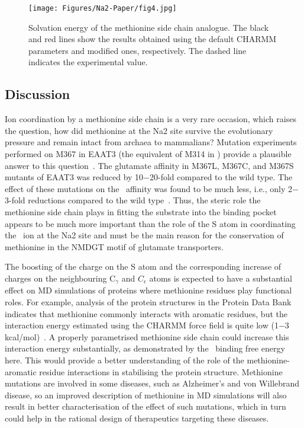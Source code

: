 \begin{figure}[t!]
\centering
\texttt{[image: Figures/Na2-Paper/fig4.jpg]}
\caption{Solvation energy of the methionine side chain analogue. The black and red 
         lines show the results obtained using the default CHARMM parameters and 
         modified ones, respectively. The dashed line indicates the experimental value.}
\label{na2:fig4}
\end{figure}

\subsection{Discussion}
Ion coordination by a methionine side chain is a very rare occasion, which raises the question, how 
did methionine at the Na2 site survive the evolutionary pressure and remain intact from archaea to 
mammalians? Mutation experiments performed on M367 in EAAT3 (the equivalent of M314 in \GltTk) 
provide a plausible answer to this question~\cite{Rosental2010}. The glutamate affinity in M367L, 
M367C, and M367S mutants of EAAT3 was reduced by 10$-$20-fold compared to the wild type. The effect 
of these mutations on the \Na\ affinity was found to be much less, i.e., only 2$-$3-fold reductions 
compared to the wild type~\cite{Rosental2010}. Thus, the steric role the methionine side chain plays 
in fitting the substrate into the binding pocket appears to be much more important than the role 
of the S atom in coordinating the \Na\ ion at the Na2 site and must be the main reason for the 
conservation of methionine in the NMDGT motif of glutamate transporters.

The boosting of the charge on the S atom and the corresponding increase of charges on the 
neighbouring C$_{\gamma}$ and $C_{\epsilon}$ atoms is expected to have a substantial effect on MD 
simulations of proteins where methionine residues play functional roles. For example, analysis of 
the protein structures in the Protein Data Bank indicates that methionine commonly interacts with 
aromatic residues, but the interaction energy estimated using the CHARMM force field is quite low 
(1$-$3 kcal/mol)~\cite{Valley2012}. A properly parametrised methionine side chain could increase 
this interaction energy substantially, as demonstrated by the \Na\ binding free energy here. This 
would provide a better understanding of the role of the methionine-aromatic residue interactions 
in stabilising the protein structure. Methionine mutations are involved in some diseases, such as 
Alzheimer's and von Willebrand disease, so an improved description of methionine in MD simulations 
will also result in better characterisation of the effect of such mutations, which in turn could 
help in the rational design of therapeutics targeting these diseases.

